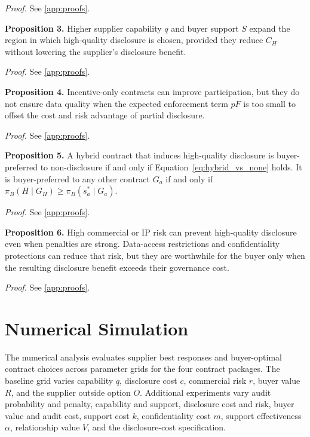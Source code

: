 \documentclass[final,5p,times,authoryear]{elsarticle}
\begin{document}
\textit{Proof.} See \ref{app:proofs}.

\textbf{Proposition 3.} Higher supplier capability $q$ and buyer support $S$ expand the region in which high-quality disclosure is chosen, provided they reduce $C_H$ without lowering the supplier's disclosure benefit.

\textit{Proof.} See \ref{app:proofs}.

\textbf{Proposition 4.} Incentive-only contracts can improve participation, but they do not ensure data quality when the expected enforcement term $pF$ is too small to offset the cost and risk advantage of partial disclosure.

\textit{Proof.} See \ref{app:proofs}.

\textbf{Proposition 5.} A hybrid contract that induces high-quality disclosure is buyer-preferred to non-disclosure if and only if Equation~\ref{eq:hybrid_vs_none} holds. It is buyer-preferred to any other contract $G_a$ if and only if $\pi_B(H\mid G_H)\geq \pi_B(s_a^*\mid G_a)$.

\textit{Proof.} See \ref{app:proofs}.

\textbf{Proposition 6.} High commercial or IP risk can prevent high-quality disclosure even when penalties are strong. Data-access restrictions and confidentiality protections can reduce that risk, but they are worthwhile for the buyer only when the resulting disclosure benefit exceeds their governance cost.

\textit{Proof.} See \ref{app:proofs}.

\section{Numerical Simulation}

The numerical analysis evaluates supplier best responses and buyer-optimal contract choices across parameter grids for the four contract packages. The baseline grid varies capability $q$, disclosure cost $c$, commercial risk $r$, buyer value $R$, and the supplier outside option $O$. Additional experiments vary audit probability and penalty, capability and support, disclosure cost and risk, buyer value and audit cost, support cost $k$, confidentiality cost $m$, support effectiveness $\alpha$, relationship value $V$, and the disclosure-cost specification.
\end{document}
